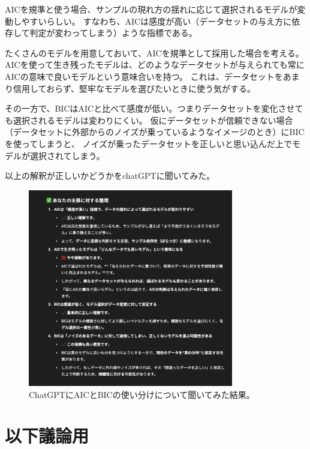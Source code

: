 \documentclass[dvipdfmx]{jsarticle}
\begin{document}
\newpage
\begin{mybox}
AICを規準と使う場合、サンプルの現れ方の揺れに応じて選択されるモデルが変動しやすいらしい。
すなわち、AICは感度が高い（データセットの与え方に依存して判定が変わってしまう）ような指標である。

たくさんのモデルを用意しておいて、AICを規準として採用した場合を考える。
AICを使って生き残ったモデルは、どのようなデータセットが与えられても常にAICの意味で良いモデルという意味合いを持つ。
これは、データセットをあまり信用しておらず、堅牢なモデルを選びたいときに使う気がする。

その一方で、BICはAICと比べて感度が低い。つまりデータセットを変化させても選択されるモデルは変わりにくい。
仮にデータセットが信頼できない場合（データセットに外部からのノイズが乗っているようなイメージのとき）にBICを使ってしまうと、
ノイズが乗ったデータセットを正しいと思い込んだ上でモデルが選択されてしまう。
\end{mybox}
以上の解釈が正しいかどうかをchatGPTに聞いてみた。
\begin{figure}[H]
    \centering
    \includegraphics[width=0.8\textwidth]{aic-bic-chatgpt.png}
    \caption{ChatGPTにAICとBICの使い分けについて聞いてみた結果。}
    \label{fig:aic_bic_chatgpt}
\end{figure}

\newpage
\section{以下議論用}
\end{document}
